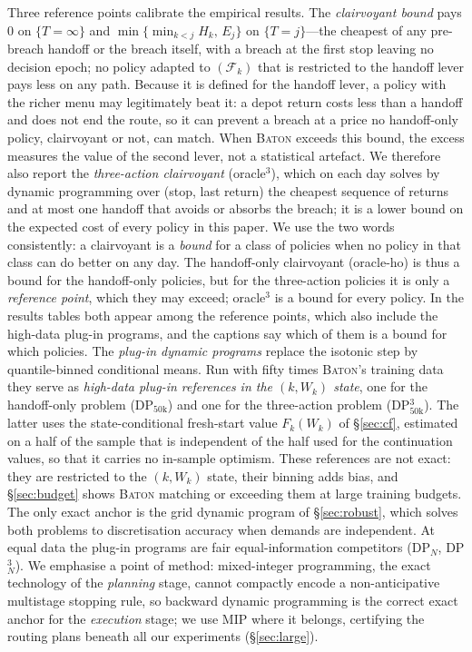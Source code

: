 \documentclass[preprint,authoryear,12pt]{elsarticle}
\theoremstyle{definition}
\theoremstyle{remark}
\begin{document}
Three reference points calibrate the empirical results. The
\emph{clairvoyant bound} pays $0$ on $\{T = \infty\}$ and
$\min\{\min_{k<j} H_k,\, E_j\}$ on $\{T = j\}$---the cheapest of any
pre-breach handoff or the breach itself, with a breach at the first stop
leaving no decision epoch; no policy adapted to $(\mathcal F_k)$ that is
restricted to the handoff lever pays less on any path. Because it is
defined for the handoff lever, a policy with the richer menu may
legitimately beat it: a depot return costs less than a handoff and does
not end the route, so it can prevent a breach at a price no handoff-only
policy, clairvoyant or not, can match. When \textsc{Baton} exceeds this
bound, the excess measures the value of the second lever, not a
statistical artefact. We therefore also report the \emph{three-action
clairvoyant} (oracle$^3$), which on each day solves by dynamic
programming over (stop, last return) the cheapest sequence of returns
and at most one handoff that avoids or absorbs the breach; it is a lower
bound on the expected cost of every policy in this paper. We use the two
words consistently: a clairvoyant is a \emph{bound} for a class of
policies when no policy in that class can do better on any day. The
handoff-only clairvoyant (oracle-ho) is thus a bound for the handoff-only
policies, but for the three-action policies it is only a \emph{reference
point}, which they may exceed; oracle$^3$ is a bound for every policy.
In the results tables both appear among the reference points, which
also include the high-data plug-in programs, and the captions say which
of them is a bound for which policies. The
\emph{plug-in dynamic programs} replace the isotonic step by
quantile-binned conditional means. Run with fifty times
\textsc{Baton}'s training data they serve as \emph{high-data plug-in
references in the $(k, W_k)$ state}, one for the handoff-only problem
(DP$_{50\mathrm{k}}$) and one for the three-action problem
(DP$^{3}_{50\mathrm{k}}$). The latter uses the state-conditional
fresh-start value $F_k(W_k)$ of \S\ref{sec:cf}, estimated on a half of
the sample that is independent of the half used for the continuation
values, so that it carries no in-sample optimism. These
references are not exact: they are restricted to the $(k, W_k)$ state,
their binning adds bias, and \S\ref{sec:budget} shows \textsc{Baton}
matching or exceeding them at large training budgets. The only exact
anchor is the grid dynamic program of \S\ref{sec:robust}, which solves
both problems to discretisation accuracy when demands are independent.
At equal data the plug-in programs are fair equal-information
competitors (DP$_N$, DP$^3_N$). We emphasise a
point of method: mixed-integer programming, the exact technology of the
\emph{planning} stage, cannot compactly encode a non-anticipative
multistage stopping rule, so backward dynamic programming is the correct
exact anchor for the \emph{execution} stage; we use MIP where it
belongs, certifying the routing plans beneath all our experiments
(\S\ref{sec:large}).
\end{document}
